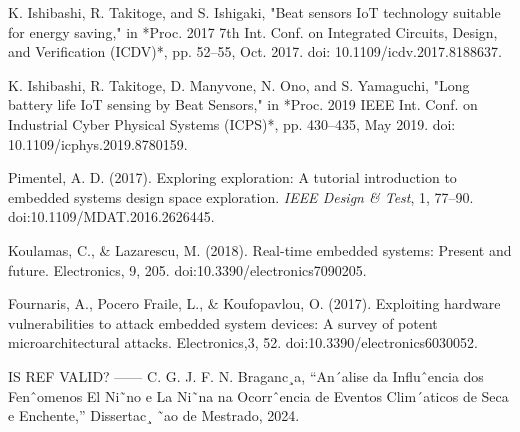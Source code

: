 \documentclass[conference]{IEEEtran}
\begin{document}
\begin{thebibliography}{00}
K. Ishibashi, R. Takitoge, and S. Ishigaki, 
"Beat sensors IoT technology suitable for energy saving," 
in *Proc. 2017 7th Int. Conf. on Integrated Circuits, Design, and Verification (ICDV)*, pp. 52--55, Oct. 2017. doi: 10.1109/icdv.2017.8188637.

K. Ishibashi, R. Takitoge, D. Manyvone, N. Ono, and S. Yamaguchi, 
"Long battery life IoT sensing by Beat Sensors," 
in *Proc. 2019 IEEE Int. Conf. on Industrial Cyber Physical Systems (ICPS)*, pp. 430--435, May 2019. doi: 10.1109/icphys.2019.8780159.

Pimentel, A. D. (2017). Exploring exploration: A tutorial introduction to embedded systems design space exploration. \textit{IEEE Design \& Test}, 1, 77--90. doi:10.1109/MDAT.2016.2626445.

Koulamas, C., \& Lazarescu, M. (2018). Real-time embedded systems: Present and future. Electronics, 9, 205. doi:10.3390/electronics7090205.

Fournaris, A., Pocero Fraile, L., \& Koufopavlou, O. (2017). Exploiting hardware vulnerabilities to attack embedded system devices: A survey of potent microarchitectural attacks. Electronics,3, 52. doi:10.3390/electronics6030052.

\end{thebibliography}
 \vspace{12pt}
 \color{red}

IS REF VALID? ------  C. G. J. F. N. Braganc¸a, “An´alise da Influˆencia dos Fenˆomenos El Ni˜no
e La Ni˜na na Ocorrˆencia de Eventos Clim´aticos de Seca e Enchente,”
Dissertac¸ ˜ao de Mestrado, 2024.  
\end{document}
